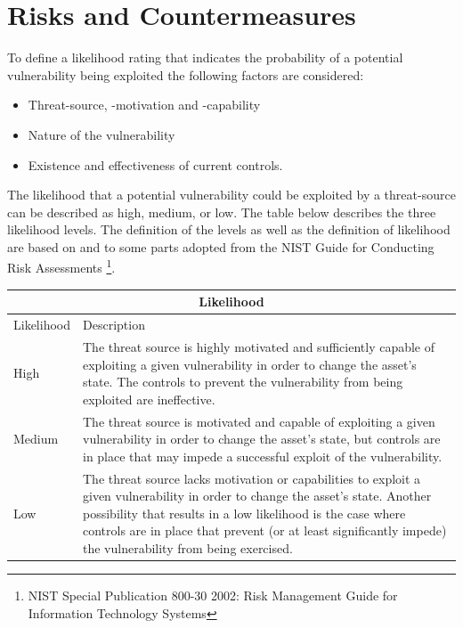 \documentclass[a4paper, toc=index, 12pt, DIV14, twoside, BCOR2cm, headsepline, numbers=noenddot, bibliography=totoc]{report}
\begin{document}
\section{Risks and Countermeasures}

To define a likelihood rating that indicates the probability of a potential vulnerability being exploited the following factors are considered:
\begin{itemize}
\item Threat-source, -motivation and -capability
\item Nature of the vulnerability
\item Existence and effectiveness of current controls.
\end{itemize}
The likelihood that a potential vulnerability could be exploited by a threat-source can be described as high, medium, or low. The table below describes the three likelihood levels. The definition of the levels as well as the definition of likelihood are based on and to some parts adopted from the NIST Guide for Conducting Risk Assessments \footnote{NIST Special Publication 800-30 2002: Risk Management Guide for Information Technology Systems}.

\begin{center}
\begin{tabular}{|l|p{10cm}|}
\hline
\multicolumn{2}{|c|}{\bf Likelihood} \\
\hline
Likelihood & Description \\
\hline
\hline
High   & \hspace*{20pt}
The threat source is highly motivated and sufficiently capable of exploiting a given vulnerability in order to change the asset's state. The controls to prevent the vulnerability from being exploited are ineffective. \\
\hline
Medium & \hspace*{20pt}
The threat source is motivated and capable of exploiting a given vulnerability in order to change the asset's state, but controls are in place that may impede a successful exploit of the vulnerability. \\
\hline
Low   & \hspace*{20pt}
The threat source lacks motivation or capabilities to exploit a given vulnerability in order to change the asset's state. Another possibility that results in a low likelihood is the case where controls are in place that prevent (or at least significantly impede) the vulnerability from being exercised. \\
\hline
\end{tabular}
\end{center}
\end{document}
